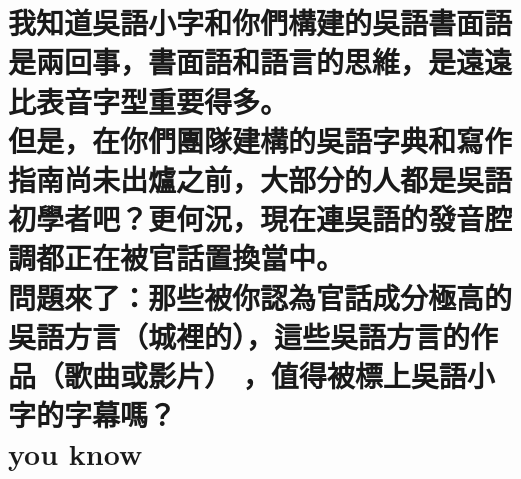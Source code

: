 %
% 
% 
% 

\chapter[我知道吳語小字和你們構建的吳語書面語是兩回事，書面語和語言的思維，是遠遠比表音字型重要得多。 但是，在你們團隊建構的吳語字典和寫作指南尚未出爐之前，大部分的人都是吳語初學者吧？更何況，現在連吳語的發音腔調都正在被官話置換當中。 問題來了：那些被你認為官話成分極高的吳語方言（城裡的），這些吳語方言的作品（歌曲或影片） ，值得被標上吳語小字的字幕嗎？ you know]{我知道吳語小字和你們構建的吳語書面語是兩回事，書面語和語言的思維，是遠遠比表音字型重要得多。 \\[0.35em] 但是，在你們團隊建構的吳語字典和寫作指南尚未出爐之前，大部分的人都是吳語初學者吧？更何況，現在連吳語的發音腔調都正在被官話置換當中。 \\[0.35em] 問題來了：那些被你認為官話成分極高的吳語方言（城裡的），這些吳語方言的作品（歌曲或影片） ，值得被標上吳語小字的字幕嗎？ \\[0.35em] you know}

